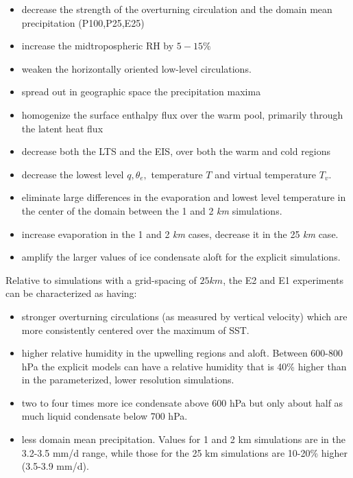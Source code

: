 \documentclass[draft]{agujournal2019}
\begin{document}
\begin{itemize}
  \item decrease the strength of the overturning circulation and the domain mean precipitation (P100,P25,E25)
  \item increase the midtropospheric RH by $5-15 \% $
  \item weaken the horizontally oriented low-level circulations.   
  \item spread out in geographic space the precipitation maxima
  \item homogenize the surface enthalpy flux over the warm pool, primarily through the latent heat flux
  \item decrease both the LTS and the EIS, over both the warm and cold regions
  \item decrease the lowest level $q, \theta_e,$ temperature $T$ and virtual temperature $T_v$.  
  \item eliminate large differences in the evaporation and lowest level temperature in the center of the domain between 
           the 1 and 2 \textit{km} simulations. 
  \item increase evaporation in the 1 and 2 \textit{km} cases, decrease it in the 25 \textit{km} case.
  \item amplify the larger values of ice condensate aloft for the explicit simulations.  
\end{itemize}

Relative to simulations with a grid-spacing of $25 \textit{km}$, the E2 and E1 experiments can be characterized as having: 
\begin{itemize}
  \item stronger overturning circulations (as measured by vertical velocity) which are more consistently centered 
  over the maximum of SST.  
  \item higher relative humidity in the upwelling regions and aloft.   Between 600-800 hPa the explicit models 
  can have a relative humidity 
  that is 40\% higher than in the parameterized, lower resolution simulations.  
  \item two to four times more ice condensate above 600 hPa but only about half as much liquid condensate below 700 hPa.
  \item less domain mean precipitation.  Values for 1 and 2 km simulations are in the 3.2-3.5 mm/d range, while those for the 25 km 
  simulations are 10-20\% higher (3.5-3.9 mm/d).  
\end{itemize}
\end{document}
